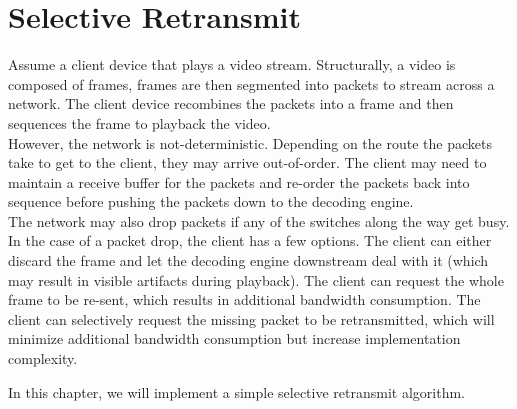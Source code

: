 
% 

\chapter{Selective Retransmit}

Assume a client device that plays a video stream. Structurally, a video is
composed of frames, frames are then segmented into packets to stream across a
network. The client device recombines the packets into a frame and then sequences the frame to playback the video.\\

However, the network is not-deterministic. Depending on the route the packets take
to get to the client, they may arrive out-of-order. The client may need to
maintain a receive buffer for the packets and re-order the packets back into
sequence before pushing the packets down to the decoding engine.\\

The network may also drop packets if any of the switches along the way get busy.
In the case of a packet drop, the client has a few options. The client can
either discard the frame and let the decoding engine downstream deal with it
(which may result in visible artifacts during playback). The client can request
the whole frame to be re-sent, which results in additional bandwidth
consumption.  The client can selectively request the missing packet to be
retransmitted, which will minimize additional bandwidth consumption but increase
implementation complexity.\newline

In this chapter, we will implement a simple selective retransmit
algorithm.\newline

